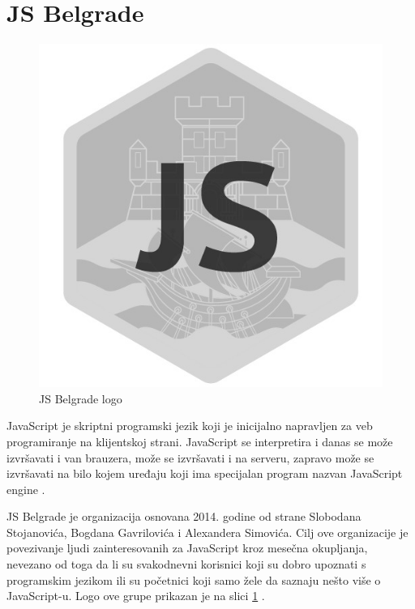 \documentclass[a4paper]{article}
\begin{document}
{\newpage

\section{JS Belgrade}
\label{sec:JSBM}

\begin{figure}[h!]
\begin{center}
\includegraphics[scale=0.25]{JS_logo.png}
\end{center}
\caption{JS Belgrade logo}
\label{fig:JS_slika}
\end{figure}

JavaScript je skriptni programski jezik koji je inicijalno napravljen za veb programiranje na klijentskoj strani. JavaScript se interpretira i danas se može izvršavati i van brauzera, može se izvršavati i na serveru, zapravo može se izvršavati na bilo kojem uređaju koji ima specijalan program nazvan JavaScript engine \cite{aboutJS}. 

JS Belgrade je organizacija osnovana 2014. godine od strane Slobodana Stojanovića, Bogdana Gavrilovića i Alexandera Simovića. Cilj ove organizacije je povezivanje ljudi zainteresovanih za JavaScript kroz mesečna okupljanja, nevezano od toga da li su svakodnevni korisnici koji su dobro upoznati s programskim jezikom ili su početnici koji samo žele da saznaju nešto više o JavaScript-u. Logo ove grupe prikazan je na slici \ref{fig:JS_slika} \cite{JS_Belgrade_meetup_pocetna}.

}
\end{document}
